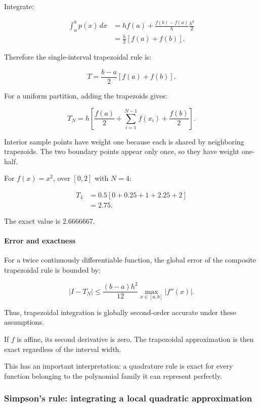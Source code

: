 Integrate:

\[
\begin{aligned} \int_a^b p(x)\,dx &=hf(a)+ \frac{f(b)-f(a)}h\frac{h^2}{2}\\ &=\frac h2[f(a)+f(b)]. \end{aligned}
\]

Therefore the single-interval trapezoidal rule is:

\[
\boxed{ T=\frac{b-a}{2}[f(a)+f(b)] }.
\]

For a uniform partition, adding the trapezoids gives:

\[
\boxed{ T_N= h\left[ \frac{f(a)}2+ \sum_{i=1}^{N-1}f(x_i)+ \frac{f(b)}2 \right] }.
\]

Interior sample points have weight one because each is shared by neighboring trapezoids. The two boundary points appear only once, so they have weight one-half.

For \(f(x)=x^2\), over \([0,2]\) with \(N=4\):

\[
\begin{aligned} T_4 &=0.5[ 0+0.25+1+2.25+2 ]\\ &=\boxed{2.75}. \end{aligned}
\]

The exact value is \(2.6666667\).

\paragraph{Error and exactness}\label{02-foundations-ii-ch022-error-and-exactness}

\hypertarget{02-foundations-ii-ch022-error-and-exactness}{}

For a twice continuously differentiable function, the global error of the composite trapezoidal rule is bounded by:

\[
\boxed{ |I-T_N| \le \frac{(b-a)h^2}{12} \max_{x\in[a,b]}|f''(x)| }.
\]

Thus, trapezoidal integration is globally second-order accurate under these assumptions.

If \(f\) is affine, its second derivative is zero. The trapezoidal approximation is then exact regardless of the interval width.

This has an important interpretation: a quadrature rule is exact for every function belonging to the polynomial family it can represent perfectly.

\subsubsection{Simpson's rule: integrating a local quadratic approximation}\label{02-foundations-ii-ch022-simpsons-rule-integrating-a-local-quadratic-approximation}

